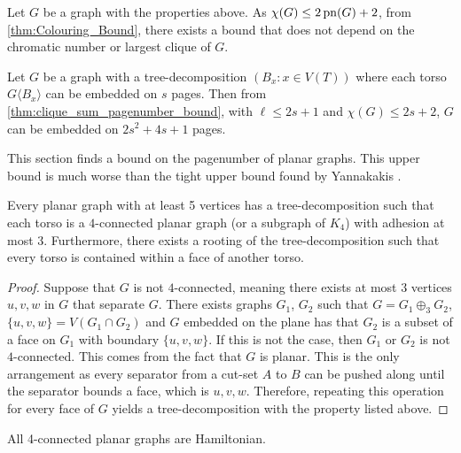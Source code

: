 Let $G$ be a graph with the properties above. As \(\chi(G) \leq 2 \operatorname{pn}(G) + 2\), from \cref{thm:Colouring_Bound}, there exists a bound that does not depend on the chromatic number or largest clique of \(G\).
\begin{corollary}\label{corr:bded_pn_tree_decomp}
	Let \(G\) be a graph with a tree-decomposition \((B_x: x \in V(T))\) where each torso \(G \langle B_x \rangle\) can be embedded on $s$ pages. Then from \cref{thm:clique_sum_pagenumber_bound}, with $\ell \leq 2s + 1$ and $\chi(G) \leq 2 s + 2$, \(G\) can be embedded on \(2s^2 + 4s + 1\) pages.
\end{corollary}

This section finds a bound on the pagenumber of planar graphs. This upper bound is much worse than the tight upper bound found by Yannakakis \cite{yannakakisEmbeddingPlanarGraphs1989}. 

\begin{lemma}\label{lem:planar_graphs_4_connected_cliqesums}
	Every planar graph with at least 5 vertices has a tree-decomposition such that each torso is a \(4\)-connected planar graph (or a subgraph of $K_4$) with adhesion at most \(3\). Furthermore, there exists a rooting of the tree-decomposition such that every torso is contained within a face of another torso. 
\end{lemma}

\begin{proof}
	Suppose that $G$ is not $4$-connected, meaning there exists at most $3$ vertices $u, v, w$ in $G$ that separate $G$. There exists graphs $G_1$, $G_2$ such that $G = G_1 \oplus_3 G_2$, $\{u, v, w\} = V(G_1 \cap G_2)$ and $G$ embedded on the plane has that $G_2$ is a subset of a face on $G_1$ with boundary $\{u, v, w\}$. If this is not the case, then $G_1$ or $G_2$ is not $4$-connected. This comes from the fact that $G$ is planar. This is the only arrangement as every separator from a cut-set $A$ to $B$ can be pushed along until the separator bounds a face, which is $u, v, w$. Therefore, repeating this operation for every face of $G$ yields a tree-decomposition with the property listed above. 
\end{proof}

\begin{theorem}\label{thm:4-connected_planar_ham_cycle}
	All 4-connected planar graphs are Hamiltonian.
\end{theorem}

